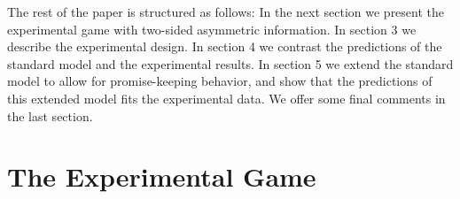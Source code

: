 \documentclass[12pt]{article}
\theoremstyle{break}
\begin{document}

The rest of the paper is structured as follows: In the next section we present the experimental game with two-sided asymmetric information. In section 3 we describe the experimental design. In section 4 we contrast the predictions of the standard model and the experimental results. In section 5 we extend the standard model to allow for promise-keeping behavior, and show that the predictions of this extended model fits the experimental data. We offer some final comments in the last section.

\section{The Experimental Game}
\end{document}
